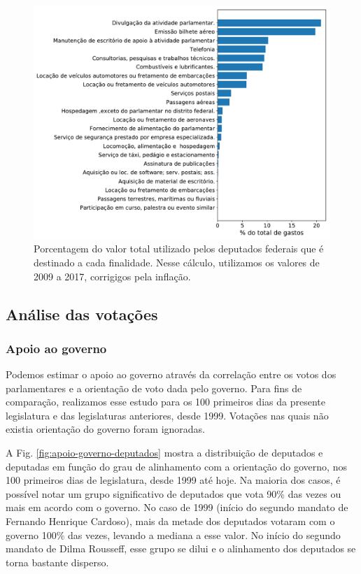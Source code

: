 \documentclass[12pt,a4paper]{article}
\begin{document}
\begin{figure}[t]
\centering
\includegraphics[width=1.0\textwidth]{graficos/total-despesas-por-tipo_2019-04-29.pdf}
\caption{Porcentagem do valor total utilizado pelos deputados federais que é destinado a cada finalidade. Nesse
cálculo, utilizamos os valores de 2009 a 2017, corrigigos pela inflação.}
\label{fig:despesas-por-tipo}
\end{figure} 


\subsection{Análise das votações}

\subsubsection{Apoio ao governo}

Podemos estimar o apoio ao governo através da correlação entre os votos dos parlamentares e a orientação de voto
dada pelo governo. Para fins de comparação, realizamos esse estudo para os 100 primeiros dias da presente legislatura
e das legislaturas anteriores, desde 1999. Votações nas quais não existia orientação do governo foram ignoradas.

A Fig. \ref{fig:apoio-governo-deputados} mostra a distribuição de deputados e deputadas em função do grau de
alinhamento com a orientação do governo, nos 100 primeiros dias de legislatura, desde 1999 até hoje.
Na maioria dos casos, é possível notar um grupo significativo de deputados que vota 90\% das vezes ou mais em acordo com o governo.
No caso de 1999 (início do segundo mandato de Fernando Henrique Cardoso), mais da metade dos deputados votaram
com o governo 100\% das vezes, levando a mediana a esse valor. No início do segundo mandato de Dilma Rousseff,
esse grupo se dilui e o alinhamento dos deputados se torna bastante disperso.
\end{document}
